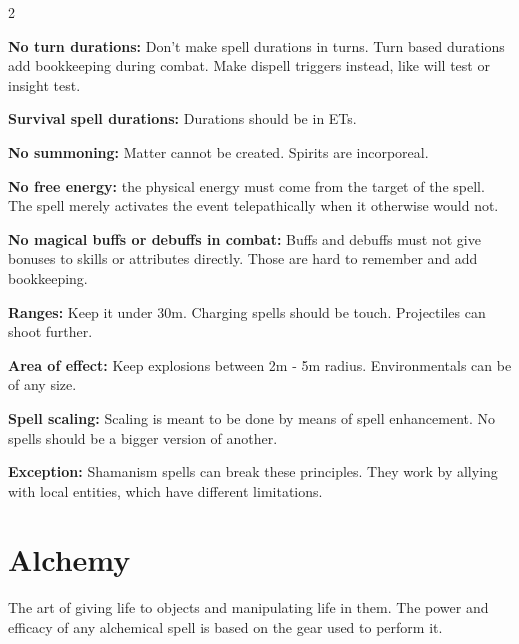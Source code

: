\begin{multicols}{2}
\begin{proplist}
    \item \textbf{No turn durations:} Don't make spell durations in turns. Turn based durations add bookkeeping during combat. Make dispell triggers instead, like will test or insight test.
    \item \textbf{Survival spell durations:} Durations should be in ETs.
    \item \textbf{No summoning:} Matter cannot be created. Spirits are incorporeal.
    \item \textbf{No free energy:} the physical energy must come from the target of the spell. The spell merely activates the event telepathically when it otherwise would not.
    \item \textbf{No magical buffs or debuffs in combat:} Buffs and debuffs must not give bonuses to skills or attributes directly. Those are hard to remember and add bookkeeping.
    \item \textbf{Ranges:} Keep it under 30m. Charging spells should be touch. Projectiles can shoot further.
    \item \textbf{Area of effect:} Keep explosions between 2m - 5m radius. Environmentals can be of any size.
    \item \textbf{Spell scaling:} Scaling is meant to be done by means of spell enhancement. No spells should be a bigger version of another.
\end{proplist}

\textbf{Exception:} Shamanism spells can break these principles. They work by allying with local entities, which have different limitations.

\section{Alchemy}

The art of giving life to objects and manipulating life in them. The power and efficacy of any alchemical spell is based on the gear used to perform it.





\end{multicols}
